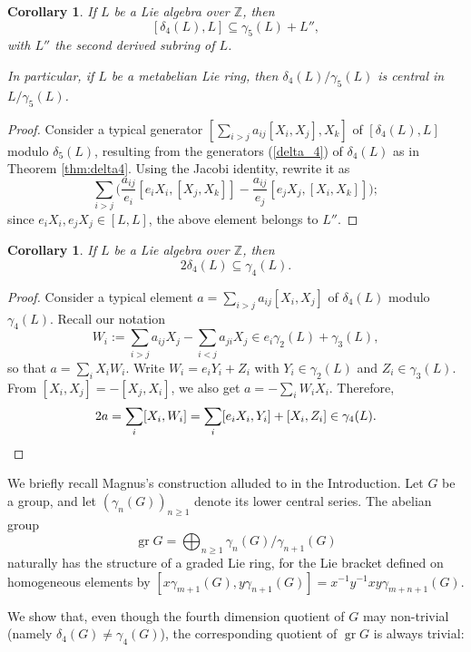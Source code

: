 \documentclass[a4paper,reqno,notitlepage]{amsart}
\newtheorem{cor}[theorem]{Corollary}
\theoremstyle{definition}
\newcommand{\Z}{\mathbb Z}
\newcommand\gr{\operatorname{gr}}
\begin{document}
\begin{cor}
  If $L$ be a Lie algebra over $\Z$, then
  \[[\delta_4(L),L] \subseteq \gamma_5(L)+L'',\]
  with $L''$  the second derived subring of $L$. 

  In particular, if $L$ be a metabelian Lie ring, then
  $\delta_4(L)/\gamma_5(L)$ is central in $L/\gamma_5(L)$.
\end{cor}
\begin{proof}
  Consider a typical generator $[\sum_{i>j}a_{ij}[X_i,X_j],X_k]$ of
  $[\delta_4(L),L]$ modulo $\delta_5(L)$, resulting from the
  generators (\ref{delta_4}) of $\delta_4(L)$ as in Theorem
  \ref{thm:delta4}. Using the Jacobi identity, rewrite it as
  \begin{equation}
    \sum_{i>j}\Big(\frac{a_{ij}}{e_i}[e_iX_i,[X_j,X_k]]-\frac{a_{ij}}{e_j}[e_jX_j,[X_i,X_k]]\Big);
  \end{equation}
  since $e_iX_i,e_jX_j\in [L,L]$, the above element belongs to $L''$.
\end{proof}

\begin{cor}\label{2delta_4}
  If $L$ be a Lie algebra over $\Z$, then
  \[2\delta_4(L)\subseteq\gamma_4(L).\]
\end{cor}
\begin{proof}
  Consider a typical element $a=\sum_{i>j}a_{ij}[X_i,X_j]$ of
  $\delta_4(L)$ modulo $\gamma_4(L)$.  Recall our notation
  \[W_i:=\sum_{i>j}a_{ij}X_j-\sum_{i<j}a_{ji}X_j\in e_i\gamma_2(L)+\gamma_3(L),
  \]
  so that $a=\sum_iX_iW_i$.  Write $W_i=e_iY_i+Z_i$ with
  $Y_i\in\gamma_2(L)$ and $Z_i\in\gamma_3(L)$.  From
  $[X_i,X_j]=-[X_j,X_i]$, we also get $a=-\sum_iW_iX_i$. Therefore,
  \[2a=\sum_i[X_i,W_i]=\sum_i[e_iX_i,Y_i]+[X_i,Z_i]\in\gamma_4(L).\qedhere\]
\end{proof}

We briefly recall Magnus's construction alluded to in the
Introduction. Let $G$ be a group, and let $(\gamma_n(G))_{n\ge1}$ denote its
lower central series. The abelian group
\begin{equation}\label{eq:magnus}
  \gr G=\bigoplus_{n\ge1}\gamma_n(G)/\gamma_{n+1}(G)
\end{equation}
naturally has the structure of a graded Lie ring, for the Lie bracket
defined on homogeneous elements by
$[x\gamma_{m+1}(G),y\gamma_{n+1}(G)]=x^{-1}y^{-1}xy\gamma_{m+n+1}(G)$.

We show that, even though the fourth dimension quotient of $G$ may
non-trivial (namely $\delta_4(G)\neq\gamma_4(G)$), the corresponding
quotient of $\gr G$ is always trivial:
\end{document}
